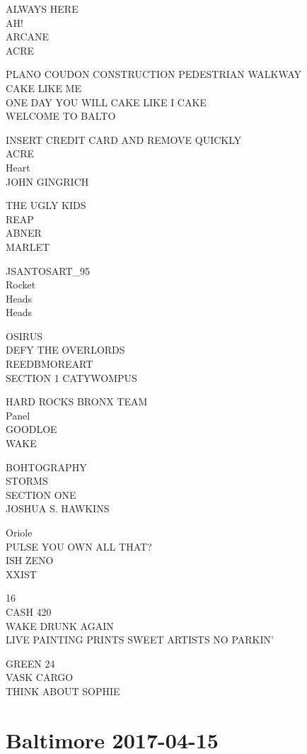 \documentclass[10pt,letterpaper]{article}
\begin{document}
ALWAYS HERE\\
AH!\\
ARCANE\\
ACRE

PLANO COUDON CONSTRUCTION PEDESTRIAN WALKWAY\\
CAKE LIKE ME\\
ONE DAY YOU WILL CAKE LIKE I CAKE\\
WELCOME TO BALTO

INSERT CREDIT CARD AND REMOVE QUICKLY\\
ACRE\\
Heart\\
JOHN GINGRICH

THE UGLY KIDS\\
REAP\\
ABNER\\
MARLET

JSANTOSART\_95\\
Rocket\\
Heads\\
Heads

OSIRUS\\
DEFY THE OVERLORDS\\
REEDBMOREART\\
SECTION 1 CATYWOMPUS

HARD ROCKS BRONX TEAM\\
Panel\\
GOODLOE\\
WAKE

BOHTOGRAPHY\\
STORMS\\
SECTION ONE\\
JOSHUA S. HAWKINS

Oriole\\
PULSE YOU OWN ALL THAT?\\
ISH ZENO\\
XXIST

16\\
CASH 420\\
WAKE DRUNK AGAIN\\
LIVE PAINTING PRINTS SWEET ARTISTS NO PARKIN'

GREEN 24\\
VASK CARGO\\
THINK ABOUT SOPHIE


\section*{Baltimore 2017-04-15}
\end{document}
